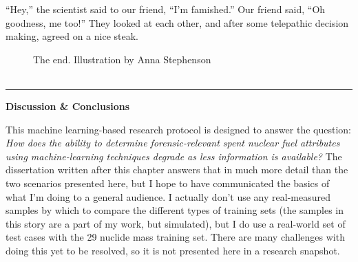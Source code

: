 {\begin{shadequote}

  ``Hey,'' the scientist said to our friend, ``I'm famished.'' Our friend said, ``Oh
  goodness, me too!'' They looked at each other, and after some telepathic
  decision making, agreed on a nice steak.

\end{shadequote}

\begin{figure}[H]
  \centering
  \large The end. \small Illustration by Anna Stephenson \\~\\
\end{figure}

\hrule

\begin{tcolorbox}[halign=center]
\textbf{Discussion \& Conclusions}
\end{tcolorbox}

This machine learning-based research protocol is designed to answer the
question: \textit{How does the ability to determine forensic-relevant spent
nuclear fuel attributes using machine-learning techniques degrade as less
information is available?} The dissertation written after this chapter answers
that in much more detail than the two scenarios presented here, but I hope to
have communicated the basics of what I'm doing to a general audience. I
actually don't use any real-measured samples by which to compare the different
types of training sets (the samples in this story are a part of my work, but
simulated), but I do use a real-world set of test cases with the 29 nuclide
mass training set.  There are many challenges with doing this yet to be
resolved, so it is not presented here in a research snapshot.

}
